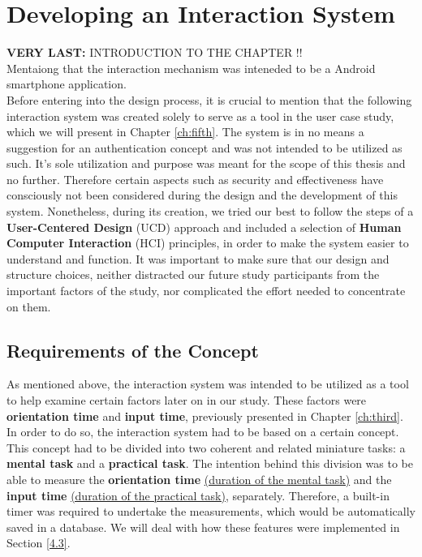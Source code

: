 
\chapter{Developing an Interaction System}\label{ch:forth}
\textbf{VERY LAST: }INTRODUCTION TO THE CHAPTER !!\\
Mentaiong that the interaction mechanism was inteneded to be a Android smartphone application.\\

Before entering into the design process, it is crucial to mention that the following interaction system was created solely to serve as a tool in the user case study, which we will present in Chapter \ref{ch:fifth}. The system is in no means a suggestion for an authentication concept and was not intended to be utilized as such. It's sole utilization and purpose was meant for the scope of this thesis and no further. Therefore certain aspects such as security and effectiveness have consciously not been considered during the design and the development of this system. Nonetheless, during its creation, we tried our best to follow the steps of a \textbf{User-Centered Design} (UCD) approach and included a selection of \textbf{Human Computer Interaction} (HCI) principles, in order to make the system easier to understand and function. It was important to make sure that our design and structure choices, neither distracted our future study participants from the important factors of the study, nor complicated the effort needed to concentrate on them.  


\section{Requirements of the Concept} \label{4.1}
As mentioned above, the interaction system was intended to be utilized as a tool to help examine certain factors later on in our study. These factors were \textbf{orientation time} and \textbf{input time}, previously presented in Chapter \ref{ch:third}. In order to do so, the interaction system had to be based on a certain concept. This concept had to be divided into two coherent and related miniature tasks: a \textbf{mental task} and a \textbf{practical task}. The intention behind this division was to be able to measure the \textbf{orientation time} \underline{(duration of the mental task)} and the \textbf{input time} \underline{(duration of the practical task)}, separately. Therefore, a built-in timer was required to undertake the measurements, which would be automatically saved in a database. We will deal with how these features were implemented in Section \ref{4.3}. \\

